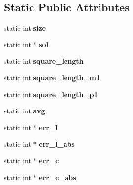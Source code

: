 \subsection*{\-Static \-Public \-Attributes}
\begin{DoxyCompactItemize}
\item 
\hypertarget{classMagicSquare_a526285b917194501dcf6656dc758926a}{static int {\bfseries size}}\label{classMagicSquare_a526285b917194501dcf6656dc758926a}

\item 
\hypertarget{classMagicSquare_a441c50e2d224b68c68b571ed6ca93506}{static int $\ast$ {\bfseries sol}}\label{classMagicSquare_a441c50e2d224b68c68b571ed6ca93506}

\item 
\hypertarget{classMagicSquare_a36cded7ec2d0e760cb344e413ff46218}{static int {\bfseries square\-\_\-length}}\label{classMagicSquare_a36cded7ec2d0e760cb344e413ff46218}

\item 
\hypertarget{classMagicSquare_a95a6a881885967a0c6b537eb91518729}{static int {\bfseries square\-\_\-length\-\_\-m1}}\label{classMagicSquare_a95a6a881885967a0c6b537eb91518729}

\item 
\hypertarget{classMagicSquare_acd21e15d520b34ba40e8f05b5cf6441d}{static int {\bfseries square\-\_\-length\-\_\-p1}}\label{classMagicSquare_acd21e15d520b34ba40e8f05b5cf6441d}

\item 
\hypertarget{classMagicSquare_a3b5958b6248adfca5b461fe1a39c038a}{static int {\bfseries avg}}\label{classMagicSquare_a3b5958b6248adfca5b461fe1a39c038a}

\item 
\hypertarget{classMagicSquare_aff35cc290ee4922a76489ab226c9d277}{static int $\ast$ {\bfseries err\-\_\-l}}\label{classMagicSquare_aff35cc290ee4922a76489ab226c9d277}

\item 
\hypertarget{classMagicSquare_ac849dbfa336a15280042b2fc2b372c79}{static int $\ast$ {\bfseries err\-\_\-l\-\_\-abs}}\label{classMagicSquare_ac849dbfa336a15280042b2fc2b372c79}

\item 
\hypertarget{classMagicSquare_ae3e52bf4e80df44fae1e301d6947ebd2}{static int $\ast$ {\bfseries err\-\_\-c}}\label{classMagicSquare_ae3e52bf4e80df44fae1e301d6947ebd2}

\item 
\hypertarget{classMagicSquare_a726c7a2306ae032767979c9fc66a07c0}{static int $\ast$ {\bfseries err\-\_\-c\-\_\-abs}}\label{classMagicSquare_a726c7a2306ae032767979c9fc66a07c0}


\end{DoxyCompactItemize}
